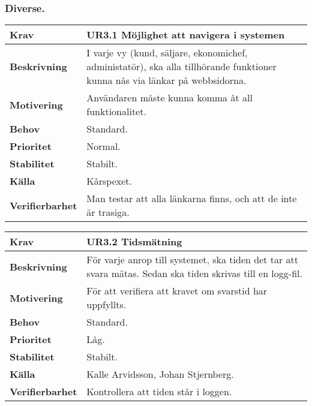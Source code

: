 \documentclass[a4paper, twoside, 11pt, titlepage]{article}
\begin{document}
		\subsubsection{Diverse.}


		\begin{tabular} { p{2.6cm} p{12.5cm} }
			\hline
			\sffamily\textbf{Krav} & \sffamily\textbf{UR3.1 Möjlighet att navigera i systemen  } \\
			\hline
			\sffamily\textbf{Beskrivning} & I varje vy (kund, säljare, ekonomichef, administatör), ska alla tillhörande funktioner kunna nås via länkar på webbsidorna.  \\
			\hline
			\sffamily\textbf{Motivering} & Användaren måste kunna komma åt all funktionalitet.  \\
			\hline
			\sffamily\textbf{Behov} & Standard.  \\
			\hline
			\sffamily\textbf{Prioritet} & Normal.  \\
			\hline
			\sffamily\textbf{Stabilitet} & Stabilt.  \\
			\hline
			\sffamily\textbf{Källa} & Kårspexet.  \\
			\hline
			\sffamily\textbf{Verifierbarhet} & Man testar att alla länkarna finns, och att de inte är trasiga.  \\
			\hline
		\end{tabular}
		\vspace{6mm}

		\begin{tabular} { p{2.6cm} p{12.5cm} }
			\hline
			\sffamily\textbf{Krav} & \sffamily\textbf{UR3.2 Tidsmätning  } \\
			\hline
			\sffamily\textbf{Beskrivning} & För varje anrop till systemet, ska tiden det tar att svara mätas. Sedan ska tiden skrivas till en logg-fil.  \\
			\hline
			\sffamily\textbf{Motivering} & För att verifiera att kravet om svarstid har uppfyllts.  \\
			\hline
			\sffamily\textbf{Behov} & Standard.  \\
			\hline
			\sffamily\textbf{Prioritet} & Låg.  \\
			\hline
			\sffamily\textbf{Stabilitet} & Stabilt.  \\
			\hline
			\sffamily\textbf{Källa} & Kalle Arvidsson, Johan Stjernberg.  \\
			\hline
			\sffamily\textbf{Verifierbarhet} & Kontrollera att tiden står i loggen.  \\
			\hline
		\end{tabular}
\end{document}
